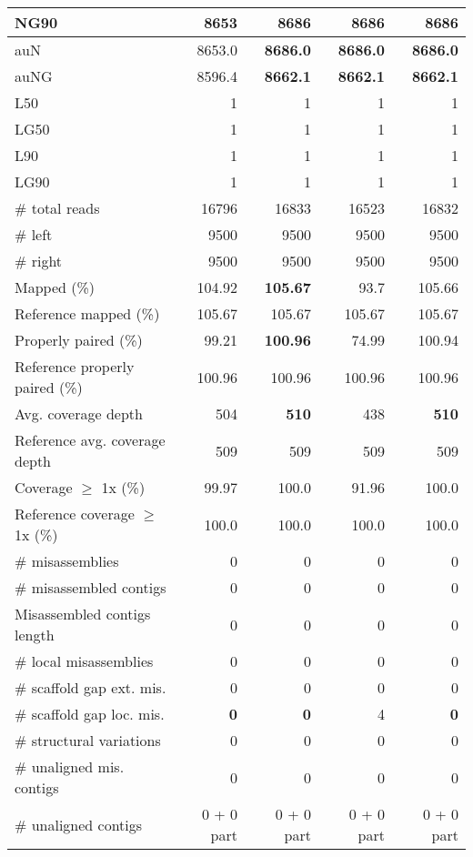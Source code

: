 \documentclass[12pt,a4paper]{article}
\begin{document}
\begin{table}[ht]
\begin{center}
\begin{tabular}{|l*{4}{|r}|}
NG90 & 8653 & {\bf 8686} & {\bf 8686} & {\bf 8686} \\ \hline
auN & 8653.0 & {\bf 8686.0} & {\bf 8686.0} & {\bf 8686.0} \\ \hline
auNG & 8596.4 & {\bf 8662.1} & {\bf 8662.1} & {\bf 8662.1} \\ \hline
L50 & 1 & 1 & 1 & 1 \\ \hline
LG50 & 1 & 1 & 1 & 1 \\ \hline
L90 & 1 & 1 & 1 & 1 \\ \hline
LG90 & 1 & 1 & 1 & 1 \\ \hline
\# total reads & 16796 & 16833 & 16523 & 16832 \\ \hline
\# left & 9500 & 9500 & 9500 & 9500 \\ \hline
\# right & 9500 & 9500 & 9500 & 9500 \\ \hline
Mapped (\%) & 104.92 & {\bf 105.67} & 93.7 & 105.66 \\ \hline
Reference mapped (\%) & 105.67 & 105.67 & 105.67 & 105.67 \\ \hline
Properly paired (\%) & 99.21 & {\bf 100.96} & 74.99 & 100.94 \\ \hline
Reference properly paired (\%) & 100.96 & 100.96 & 100.96 & 100.96 \\ \hline
Avg. coverage depth & 504 & {\bf 510} & 438 & {\bf 510} \\ \hline
Reference avg. coverage depth & 509 & 509 & 509 & 509 \\ \hline
Coverage $\geq$ 1x (\%) & 99.97 & 100.0 & 91.96 & 100.0 \\ \hline
Reference coverage $\geq$ 1x (\%) & 100.0 & 100.0 & 100.0 & 100.0 \\ \hline
\# misassemblies & 0 & 0 & 0 & 0 \\ \hline
\# misassembled contigs & 0 & 0 & 0 & 0 \\ \hline
Misassembled contigs length & 0 & 0 & 0 & 0 \\ \hline
\# local misassemblies & 0 & 0 & 0 & 0 \\ \hline
\# scaffold gap ext. mis. & 0 & 0 & 0 & 0 \\ \hline
\# scaffold gap loc. mis. & {\bf 0} & {\bf 0} & 4 & {\bf 0} \\ \hline
\# structural variations & 0 & 0 & 0 & 0 \\ \hline
\# unaligned mis. contigs & 0 & 0 & 0 & 0 \\ \hline
\# unaligned contigs & 0 + 0 part & 0 + 0 part & 0 + 0 part & 0 + 0 part \\ \hline

\end{tabular}
\end{center}
\end{table}
\end{document}
